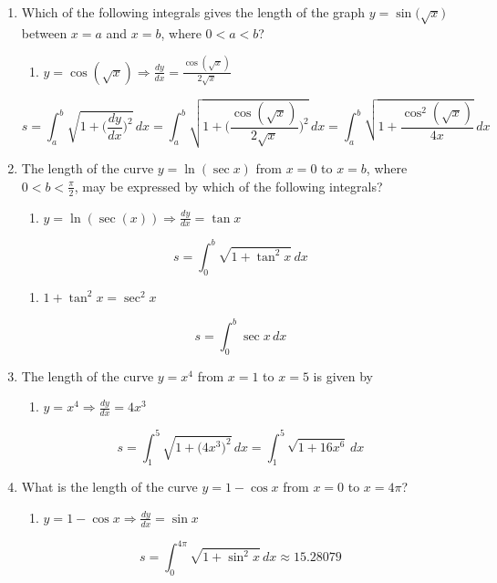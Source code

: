 \documentclass[12pt]{article}
\begin{document}
\begin{enumerate}
        \item Which of the following integrals gives the length of the graph $y=\sin \big( \sqrt{x} \big)$ between $x = a$ and $x = b$, where $0 < a < b$?
        \begin{enumerate}
            \item $y= \cos(\sqrt{x}) \Longrightarrow \frac{dy}{dx} = \frac{\cos(\sqrt{x})}{2\sqrt{x}}$
        \end{enumerate}
        $$s=\int_{a}^{b}\sqrt{1+\bigg(\frac{dy}{dx}\bigg)^2}\,dx=\int_{a}^{b}\sqrt{1+\bigg(\frac{\cos(\sqrt{x})}{2\sqrt{x}}\bigg)^2}\, dx = \boxed{\int_{a}^{b} \sqrt{1+\frac{\cos^2(\sqrt{x})}{4x}} \, dx}$$
\newpage
        \item The length of the curve $y=\ln ( \sec x)$ from $x=0$ to $x=b$, where $0<b<\frac{\pi}{2}$, may be expressed by which of the following integrals?
        \begin{enumerate}
            \item $y=\ln(\sec(x))\Longrightarrow \frac{dy}{dx} =\tan x$
        \end{enumerate}
$$s=\int_{0}^{b} \sqrt{1+\tan^2 x}\, dx$$
\begin{enumerate}[resume]
    \item $1+\tan^2 x = \sec^2 x$
\end{enumerate}
$$\boxed{s=\int_{0}^{b} \sec x \, dx}$$
        \item The length of the curve $y=x^4$ from $x=1$ to $x=5$ is given by
        \begin{enumerate}
            \item $y=x^4 \Longrightarrow \frac{dy}{dx}= 4x^3$
        \end{enumerate}
        $$s=\int_{1}^{5} \sqrt{1+\big(4x^3\big)^2}\, dx = \boxed{\int_{1}^{5} \sqrt{1+16x^6}\, dx}$$

        \item What is the length of the curve $y=1-\cos x$ from $x=0$ to $x=4\pi$?
        \begin{enumerate}
            \item $y=1-\cos x \Longrightarrow \frac{dy}{dx} = \sin x$
        \end{enumerate}
        $$s=\int_{0}^{4\pi} \sqrt{1+\sin^2 x} \, dx \approx \boxed{15.28079}$$


\end{enumerate}
\end{document}
